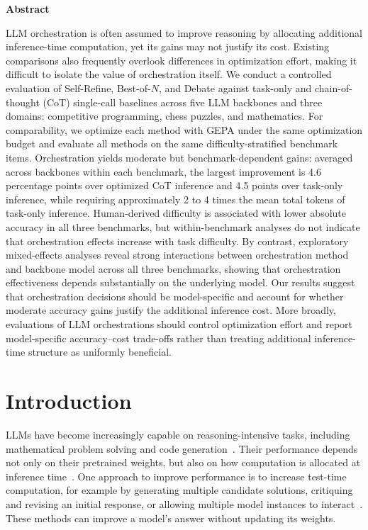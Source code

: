 \documentclass[a4paper]{article}
\theoremstyle{plain}
\theoremstyle{definition}
\theoremstyle{remark}
\begin{document}
\begin{center}
\begin{minipage}{0.85\textwidth}
\begin{center}
\textbf{Abstract}
\end{center}
{\small
LLM orchestration is often assumed to improve reasoning by allocating additional inference-time computation, yet its gains may not justify its cost. 
Existing comparisons also frequently overlook differences in optimization effort, making it difficult to isolate the value of orchestration itself. 
We conduct a controlled evaluation of Self-Refine, Best-of-$N$, and Debate against task-only and chain-of-thought (CoT) single-call baselines across five LLM backbones and three domains: competitive programming, chess puzzles, and mathematics. 
For comparability, we optimize each method with GEPA under the same optimization budget and evaluate all methods on the same difficulty-stratified benchmark items. 
Orchestration yields moderate but benchmark-dependent gains: averaged across backbones within each benchmark, the largest improvement is 4.6 percentage points over optimized CoT inference and 4.5 points over task-only inference, while requiring approximately 2 to 4 times the mean total tokens of task-only inference. 
Human-derived difficulty is associated with lower absolute accuracy in all three benchmarks, but within-benchmark analyses do not indicate that orchestration effects increase with task difficulty.
By contrast, exploratory mixed-effects analyses reveal strong interactions between orchestration method and backbone model across all three benchmarks, showing that orchestration effectiveness depends substantially on the underlying model. 
Our results suggest that orchestration decisions should be model-specific and account for whether moderate accuracy gains justify the additional inference cost. 
More broadly, evaluations of LLM orchestrations should control optimization effort and report model-specific accuracy–cost trade-offs rather than treating additional inference-time structure as uniformly beneficial.
}
\end{minipage}
\end{center}

\section{Introduction}
\label{intro}

LLMs have become increasingly capable on reasoning-intensive tasks, including mathematical problem solving and code generation~\citep{balunovic_matharena_2025, zhuo_bigcodebench_2025,zimmer_agentic_2026}.
Their performance depends not only on their pretrained weights, but also on how computation is allocated at inference time~\citep{zhou_reasoning_2026}.
One approach to improve performance is to increase test-time computation, for example by generating multiple candidate solutions, critiquing and revising an initial response, or allowing multiple model instances to interact~\citep{snell_scaling_2025,madaan_self-refine_2023,du_improving_2024}.
These methods can improve a model's answer without updating its weights.
\end{document}
